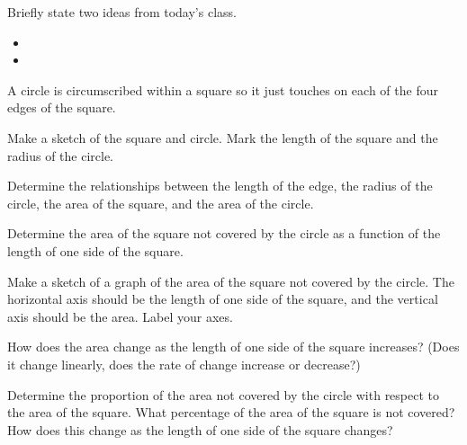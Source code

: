 \begin{problem}
\item Briefly state two ideas from today's class.
  \begin{itemize}
  \item 
  \item 
  \end{itemize}
\item A circle is circumscribed within a square so it just touches on
  each of the four edges of the square.
  \begin{subproblem}
    \item Make a sketch of the square and circle. Mark the length of
      the square and the radius of the circle.
    \item Determine the relationships between the length of the edge,
      the radius of the circle, the area of the square, and the area
      of the circle.
    \item Determine the area of the square not covered by the circle
      as a function of the length of one side of the square.
    \item Make a sketch of a graph of the area of the square not
      covered by the circle. The horizontal axis should be the length
      of one side of the square, and the vertical axis should be the
      area. Label your axes.
    \item How does the area change as the length of one side of the
      square increases? (Does it change linearly, does the rate of
      change increase or decrease?)
    \item Determine the proportion of the area not covered by the
      circle with respect to the area of the square. What percentage
      of the area of the square is not covered? How does this change
      as the length of one side of the square changes?
  \end{subproblem}
\end{problem}



